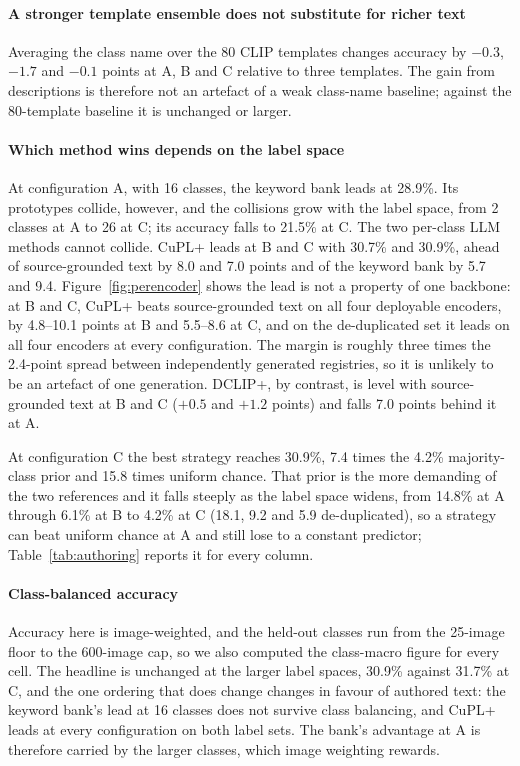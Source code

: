 \documentclass[a4paper,fleqn]{cas-dc}
\begin{document}
\paragraph{A stronger template ensemble does not substitute for richer text} Averaging the class
name over the 80 CLIP templates changes accuracy by $-0.3$, $-1.7$ and $-0.1$ points at A, B and C
relative to three templates. The gain from descriptions is therefore not an artefact of a weak
class-name baseline; against the 80-template baseline it is unchanged or larger.

\paragraph{Which method wins depends on the label space} At configuration A, with 16 classes, the
keyword bank leads at 28.9\%. Its prototypes collide, however, and the collisions grow with the label
space, from 2 classes at A to 26 at C; its accuracy falls to 21.5\% at C. The two per-class LLM
methods cannot collide. CuPL+ leads at B and C with 30.7\% and 30.9\%, ahead of source-grounded text
by 8.0 and 7.0 points and of the keyword bank by 5.7 and 9.4. Figure~\ref{fig:perencoder} shows the
lead is not a property of one backbone: at B and C, CuPL+ beats source-grounded text on all four
deployable encoders, by 4.8--10.1 points at B and 5.5--8.6 at C, and on the de-duplicated set it
leads on all four encoders at every configuration. The margin is roughly three times the 2.4-point
spread between independently generated registries, so it is unlikely to be an artefact of one
generation. DCLIP+, by contrast, is level with source-grounded text at B and C ($+0.5$ and $+1.2$
points) and falls 7.0 points behind it at A.

At configuration C the best strategy reaches 30.9\%, 7.4 times the 4.2\% majority-class prior and
15.8 times uniform chance. That prior is the more demanding of the two references and it falls
steeply as the label space widens, from 14.8\% at A through 6.1\% at B to 4.2\% at C (18.1, 9.2
and 5.9 de-duplicated), so a strategy can beat uniform chance at A and still lose to a constant
predictor; Table~\ref{tab:authoring} reports it for every column.

\paragraph{Class-balanced accuracy} Accuracy here is image-weighted, and the held-out classes run
from the 25-image floor to the 600-image cap, so we also computed the class-macro figure for every
cell. The headline is unchanged at the larger label spaces, 30.9\% against 31.7\% at C, and the
one ordering that does change changes in favour of authored text: the keyword bank's lead at 16
classes does not survive class balancing, and CuPL+ leads at every configuration on both label
sets. The bank's advantage at A is therefore carried by the larger classes, which image weighting
rewards.
\end{document}

